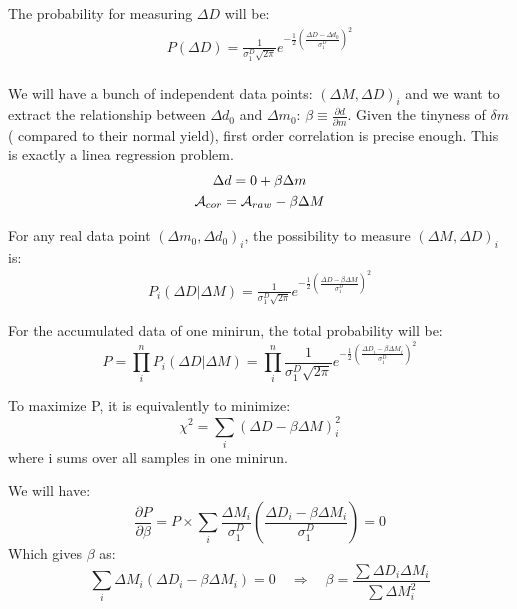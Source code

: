 The probability for measuring $\Delta D$ will be:
\begin{equation*}
    \begin{gathered}
	P(\Delta D) = \frac{1}{\sigma_1^D\sqrt{2\pi}} e^{-\frac{1}{2}\left( \frac{\Delta D - \Delta d_0}{\sigma_1^D}\right)^2}    \\
    \end{gathered}
\end{equation*}

We will have a bunch of independent data points: $(\Delta M, \Delta D)_i$ and 
we want to extract the relationship between $\Delta d_0$ and $\Delta m_0$: 
$\beta \equiv \frac{\partial d}{\partial m}$. Given the tinyness of $\delta m$ (
compared to their normal yield), first order correlation is precise enough. 
This is exactly a linea regression problem.
\begin{equation}
    \begin{gathered}
	\Delta d = 0 + \beta \Delta m	\\
	\mathcal{A}_{cor} = \mathcal{A}_{raw} - \beta\Delta M	\\
    \end{gathered}
\end{equation}

For any real data point $(\Delta m_0, \Delta d_0)_i$, the possibility to measure
$(\Delta M, \Delta D)_i$ is:
\begin{equation}
    \begin{gathered}
	P_i(\Delta D|\Delta M) = \frac{1}{\sigma_1^D\sqrt{2\pi}} 
	    e^{-\frac{1}{2}\left( \frac{\Delta D - \beta\Delta M}{\sigma_1^D}\right)^2}
    \end{gathered}
\end{equation}

For the accumulated data of one minirun, the total probability will be:
\begin{equation}
    P = \prod_i^n P_i(\Delta D|\Delta M) = \prod_i^n \frac{1}{\sigma_1^D\sqrt{2\pi}} 
	    e^{-\frac{1}{2}\left( \frac{\Delta D_i - \beta\Delta M_i}{\sigma_1^D}\right)^2}
\end{equation}

To maximize P, it is equivalently to minimize:
\begin{equation}
    \chi^2 = \sum_i (\Delta D - \beta\Delta M)_i^2
    \label{eqn:regression_chi2}
\end{equation}
where i sums over all samples in one minirun.

We will have:
\begin{equation}
    \frac{\partial P}{\partial \beta} = P \times 
    \sum_i \frac{\Delta M_i}{\sigma_1^D} \left( \frac{\Delta D_i - \beta\Delta M_i}{\sigma_1^D}\right)
    = 0
\end{equation}
Which gives $\beta$ as:
\begin{equation}
    \sum_i \Delta M_i (\Delta D_i - \beta\Delta M_i) = 0  \quad \Rightarrow \quad
    \beta = \frac{\sum \Delta D_i \Delta M_i}{\sum \Delta M^2_i}
\end{equation}

